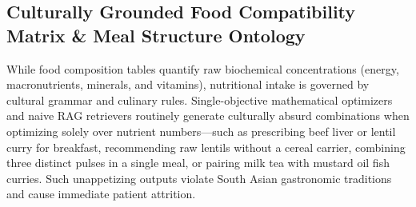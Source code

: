 \documentclass[5p,times,twocolumn]{elsarticle}
\begin{document}
\subsection{Culturally Grounded Food Compatibility Matrix \& Meal Structure Ontology}
\label{sec:food_compatibility}
While food composition tables quantify raw biochemical concentrations (energy, macronutrients, minerals, and vitamins), nutritional intake is governed by cultural grammar and culinary rules. Single-objective mathematical optimizers and naive RAG retrievers routinely generate culturally absurd combinations when optimizing solely over nutrient numbers---such as prescribing beef liver or lentil curry for breakfast, recommending raw lentils without a cereal carrier, combining three distinct pulses in a single meal, or pairing milk tea with mustard oil fish curries. Such unappetizing outputs violate South Asian gastronomic traditions and cause immediate patient attrition.
\end{document}
